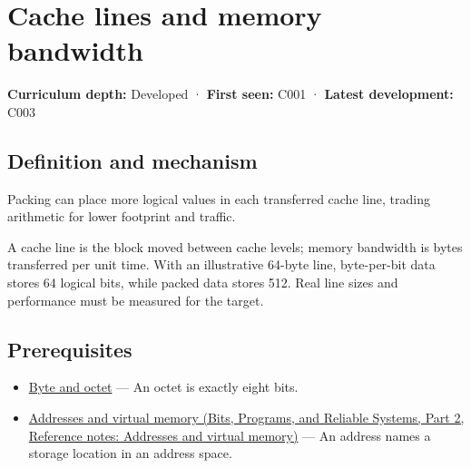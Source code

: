 \hypertarget{appendix-e4ccdbab8320}{}\label{referencestart:appendix-e4ccdbab8320}
\section{Cache lines and memory bandwidth}\label{appendix-e4ccdbab8320-cache-lines-and-memory-bandwidth}

\hypertarget{appendix-e4ccdbab8320-cache-lines-and-memory-bandwidth}{}

\textbf{Curriculum depth:} Developed · \textbf{First seen:} C001 · \textbf{Latest development:} C003

\begin{allmightroledefinition}

\subsection{Definition and mechanism}\label{appendix-e4ccdbab8320-definition-and-mechanism}

\hypertarget{appendix-e4ccdbab8320-definition-and-mechanism}{}

Packing can place more logical values in each transferred cache line, trading arithmetic for lower footprint and traffic.

\end{allmightroledefinition}

A cache line is the block moved between cache levels; memory bandwidth is bytes transferred per unit time. With an illustrative 64-byte line, byte-per-bit data stores 64 logical bits, while packed data stores 512. Real line sizes and performance must be measured for the target.

\subsection{Prerequisites}\label{appendix-e4ccdbab8320-prerequisites}

\hypertarget{appendix-e4ccdbab8320-prerequisites}{}

\begin{itemize}
\tightlist
\item
  \hyperref[appendix-5bee2df85484]{Byte and octet} --- An octet is exactly eight bits.
\item
  \href{../01-Bits-Programs-and-Reliable-Systems-P02/main.pdf\#nameddest=appendix-18ee4f913c3c}{Addresses and virtual memory (Bits, Programs, and Reliable Systems, Part 2, Reference notes: Addresses and virtual memory)} --- An address names a storage location in an address space.
\end{itemize}

